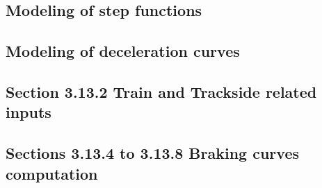 \documentclass{template/openetcs_report}
\begin{document}



\subsection{Modeling of step functions}





\subsection{Modeling of deceleration curves}





\subsection{Section 3.13.2 Train and Trackside related inputs}




\subsection{Sections 3.13.4 to 3.13.8 Braking curves computation}












\end{document}

